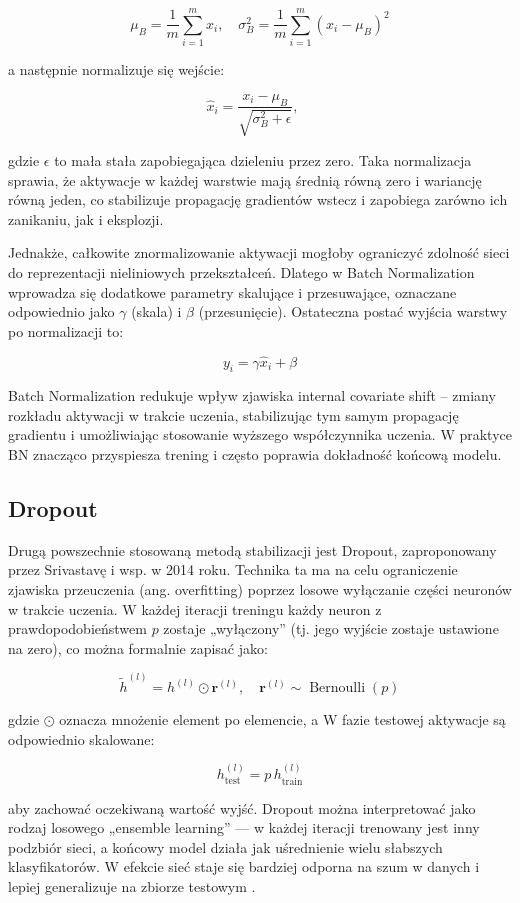 \[
\mu_B = \frac{1}{m} \sum_{i=1}^{m} x_i, \quad
\sigma_B^2 = \frac{1}{m} \sum_{i=1}^{m} (x_i - \mu_B)^2
\]

a następnie normalizuje się wejście:

\[
\hat{x}_i = \frac{x_i - \mu_B}{\sqrt{\sigma_B^2 + \epsilon}}, \quad
\]

gdzie $\epsilon$ to mała stała zapobiegająca dzieleniu przez zero.
Taka normalizacja sprawia, że aktywacje w każdej warstwie mają średnią równą zero i wariancję równą jeden, co stabilizuje propagację gradientów wstecz i zapobiega zarówno ich zanikaniu, jak i eksplozji.

Jednakże, całkowite znormalizowanie aktywacji mogłoby ograniczyć zdolność sieci do reprezentacji nieliniowych przekształceń. Dlatego w Batch Normalization wprowadza się dodatkowe parametry skalujące i przesuwające, oznaczane odpowiednio jako $\gamma$ (skala) i $\beta$ (przesunięcie). Ostateczna postać wyjścia warstwy po normalizacji to:

\[y_i = \gamma \hat{x}_i + \beta\]

Batch Normalization redukuje wpływ zjawiska internal covariate shift – zmiany rozkładu aktywacji w trakcie uczenia, stabilizując tym samym propagację gradientu i umożliwiając stosowanie wyższego współczynnika uczenia. W praktyce BN znacząco przyspiesza trening i często poprawia dokładność końcową modelu.

\cite{Ioffe2015BatchNorm}
\subsection*{Dropout}

Drugą powszechnie stosowaną metodą stabilizacji jest Dropout, zaproponowany przez Srivastavę i wsp. w 2014 roku. Technika ta ma na celu ograniczenie zjawiska przeuczenia (ang. overfitting) poprzez losowe wyłączanie części neuronów w trakcie uczenia. W każdej iteracji treningu każdy neuron z prawdopodobieństwem $p$ zostaje „wyłączony” (tj. jego wyjście zostaje ustawione na zero), co można formalnie zapisać jako:

\[
\tilde{h}^{(l)} = h^{(l)} \odot \mathbf{r}^{(l)}, \quad
\mathbf{r}^{(l)} \sim \operatorname{Bernoulli}(p)
\]

gdzie $\odot$ oznacza mnożenie element po elemencie, a 
W fazie testowej aktywacje są odpowiednio skalowane:

\[
h^{(l)}_{\text{test}} = p \, h^{(l)}_{\text{train}}
\]

aby zachować oczekiwaną wartość wyjść.
Dropout można interpretować jako rodzaj losowego „ensemble learning” — w każdej iteracji trenowany jest inny podzbiór sieci, a końcowy model działa jak uśrednienie wielu słabszych klasyfikatorów. W efekcie sieć staje się bardziej odporna na szum w danych i lepiej generalizuje na zbiorze testowym \cite{Srivastava2014Dropout}.

